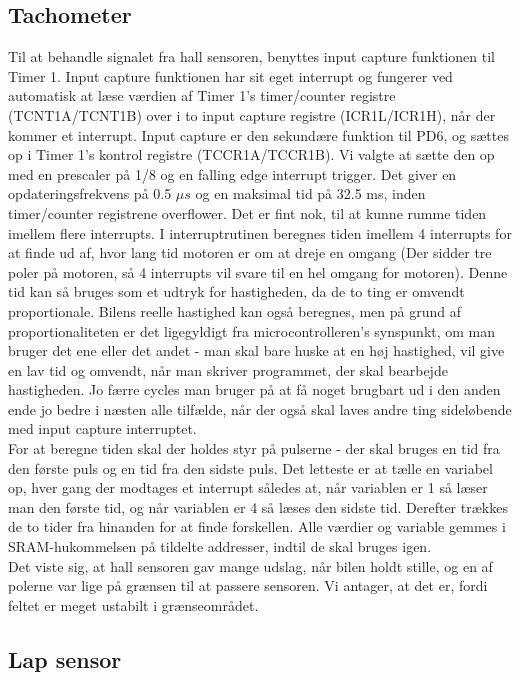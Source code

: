 \subsection{Tachometer}

Til at behandle signalet fra hall sensoren, benyttes input capture funktionen til Timer 1. Input capture funktionen har sit eget interrupt og fungerer ved automatisk at læse værdien af Timer 1's timer/counter registre (TCNT1A/TCNT1B) over i to input capture registre (ICR1L/ICR1H), når der kommer et interrupt. Input capture er den sekundære funktion til PD6, og sættes op i Timer 1's kontrol registre (TCCR1A/TCCR1B). Vi valgte at sætte den op med en prescaler på 1/8 og en falling edge interrupt trigger. Det giver en opdateringsfrekvens på 0.5 $\mu s$ og en maksimal tid på 32.5 ms, inden timer/counter registrene overflower. Det er fint nok, til at kunne rumme tiden imellem flere interrupts. I interruptrutinen beregnes tiden imellem 4 interrupts for at finde ud af, hvor lang tid motoren er om at dreje en omgang (Der sidder tre poler på motoren, så 4 interrupts vil svare til en hel omgang for motoren). Denne tid kan så bruges som et udtryk for hastigheden, da de to ting er omvendt proportionale. Bilens reelle hastighed kan også beregnes, men på grund af proportionaliteten er det ligegyldigt fra microcontrolleren's synspunkt, om man bruger det ene eller det andet - man skal bare huske at en høj hastighed, vil give en lav tid og omvendt, når man skriver programmet, der skal bearbejde hastigheden. Jo færre cycles man bruger på at få noget brugbart ud i den anden ende jo bedre i næsten alle tilfælde, når der også skal laves andre ting sideløbende med input capture interruptet.\\
For at beregne tiden skal der holdes styr på pulserne - der skal bruges en tid fra den første puls og en tid fra den sidste puls. Det letteste er at tælle en variabel op, hver gang der modtages et interrupt således at, når variablen er 1 så læser man den første tid, og når variablen er 4 så læses den sidste tid. Derefter trækkes de to tider fra hinanden for at finde forskellen. Alle værdier og variable gemmes i SRAM-hukommelsen på tildelte addresser, indtil de skal bruges igen.\\

Det viste sig, at hall sensoren gav mange udslag, når bilen holdt stille, og en af polerne var lige på grænsen til at passere sensoren. Vi antager, at det er, fordi feltet er meget ustabilt i grænseområdet. 


\subsection{Lap sensor}

